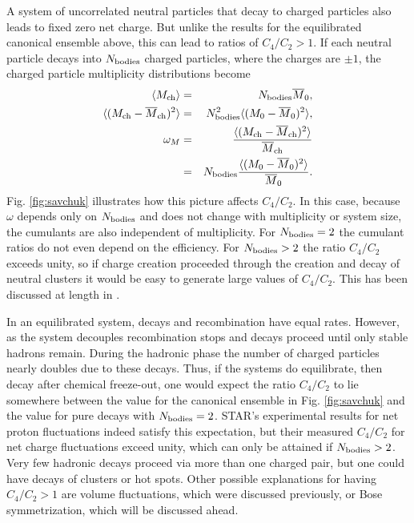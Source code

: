 A system of uncorrelated neutral particles that decay to charged particles also leads to fixed zero net charge. But unlike the results for the equilibrated canonical ensemble above, this can lead to ratios of $C_4/C_2>1$. If each neutral particle decays into $N_{\rm bodies}$ charged particles, where the charges are $\pm 1$, the charged particle multiplicity distributions become 
\begin{eqnarray}
\langle M_{\rm ch}\rangle&=&N_{\rm bodies}\overline{M}_0,\\
\nonumber
\langle(M_{\rm ch}-\overline{M}_{\rm ch})^2\rangle&=&N_{\rm bodies}^2\langle(M_0-\overline{M}_0)^2\rangle,\\
\nonumber
\omega_M&=&\frac{\langle(M_{\rm ch}-\overline{M}_{\rm ch})^2\rangle}{\overline{M}_{\rm ch}}\\
\nonumber
&=&N_{\rm bodies}\frac{\langle(M_0-\overline{M}_0)^2\rangle}{\overline{M}_0}.
\end{eqnarray}
Fig. \ref{fig:savchuk} illustrates how this picture affects $C_4/C_2$. In this case, because $\omega$ depends only on $N_{\rm bodies}$ and does not change with multiplicity or system size, the cumulants are also independent of multiplicity. For $N_{\rm bodies}=2$ the cumulant ratios do not even depend on the efficiency. For $N_{\rm bodies}>2$ the ratio $C_4/C_2$ exceeds unity, so if charge creation proceeded through the creation and decay of neutral clusters it would be easy to generate large values of $C_4/C_2$. This has been discussed at length in \cite{Bzdak:2018uhv}.

In an equilibrated system, decays and recombination have equal rates. However, as the system decouples recombination stops and decays proceed until only stable hadrons remain. During the hadronic phase the number of charged particles nearly doubles due to these decays. Thus, if the systems do equilibrate, then decay after chemical freeze-out, one would expect the ratio $C_4/C_2$ to lie somewhere between the value for the canonical ensemble in Fig. \ref{fig:savchuk} and the value for pure decays with $N_{\rm bodies}=2$. STAR's experimental results for net proton fluctuations indeed satisfy this expectation, but their measured $C_4/C_2$ for net charge fluctuations exceed unity, which can only be attained if $N_{\rm bodies}>2$. Very few hadronic decays proceed via more than one charged pair, but one could have decays of clusters or hot spots. Other possible explanations for having $C_4/C_2>1$ are volume fluctuations, which were discussed previously, or Bose symmetrization, which will be discussed ahead.


